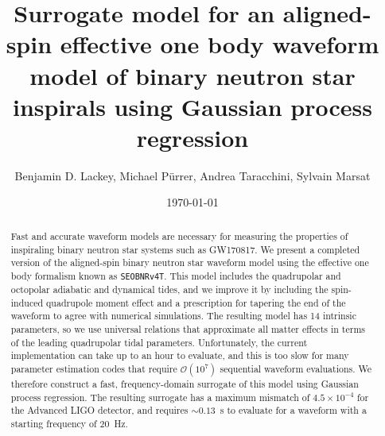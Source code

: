 \documentclass[prd,aps,letter,twocolumn,floatfix,notitlepage,nofootinbib]{revtex4-1}
\begin{document}
\title{Surrogate model for an aligned-spin effective one body waveform model of binary neutron star inspirals using Gaussian process regression}

\author{
Benjamin D. Lackey, 
Michael P\"{u}rrer, 
Andrea Taracchini,
Sylvain Marsat
}

\date{\today}

\begin{abstract}

Fast and accurate waveform models are necessary for measuring the properties of inspiraling binary neutron star systems such as GW170817. We present a completed version of the aligned-spin binary neutron star waveform model using the effective one body formalism known as \texttt{SEOBNRv4T}. This model includes the quadrupolar and octopolar adiabatic and dynamical tides, and we improve it by including the spin-induced quadrupole moment effect and a prescription for tapering the end of the waveform to agree with numerical simulations. The resulting model has 14 intrinsic parameters, so we use universal relations that approximate all matter effects in terms of the leading quadrupolar tidal parameters. Unfortunately, the current implementation can take up to an hour to evaluate, and this is too slow for many parameter estimation codes that require $\mathcal{O}(10^7)$ sequential waveform evaluations. We therefore construct a fast, frequency-domain surrogate of this model using Gaussian process regression. The resulting surrogate has a maximum mismatch of $4.5\times 10^{-4}$ for the Advanced LIGO detector, and requires $\sim 0.13$~s to evaluate for a waveform with a starting frequency of 20~Hz. 

\end{abstract}


\maketitle
\end{document}
